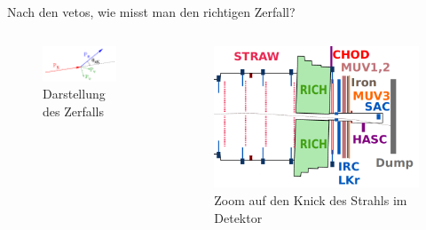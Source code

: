 \documentclass[aspectratio=1610, professionalfonts, 9pt, t]{beamer}
\begin{document}
  \begin{frame}{Nach den vetos, wie misst man den richtigen Zerfall?}
      \begin{columns}[onlytextwidth]
        \begin{column}{0.5\textwidth}
          \begin{figure}[ht]
            \begin{center}
              \includegraphics[width=0.9\textwidth]{Images/na62missing.png} %
              \caption{Darstellung des Zerfalls}
            \end{center}
          \end{figure}
        \end{column}
        \begin{column}{0.5\textwidth}
          \begin{figure}[ht]
            \begin{center}
              \includegraphics[height=0.6\textheight]{Images/na62knick.png} %
              \caption{Zoom auf den Knick des Strahls im Detektor}
            \end{center}
          \end{figure}
        \end{column}
      \end{columns}
  \end{frame}
\end{document}
